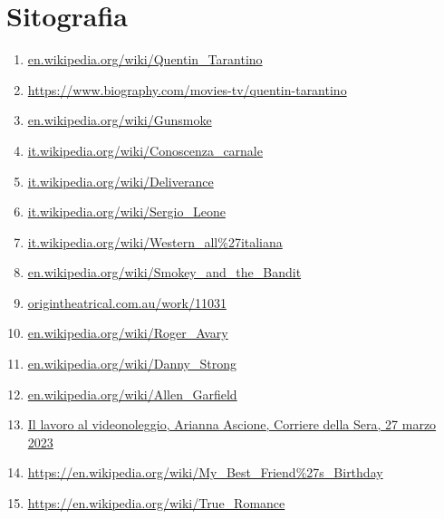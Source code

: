 \documentclass[12pt]{article} %
\begin{document}
\section {Sitografia}
\begin{flushleft}
    \small
    \begin{enumerate}
        \item \href{https://en.wikipedia.org/wiki/Quentin_Tarantino}{en.wikipedia.org/wiki/Quentin\_Tarantino}
        \item \href{https://https://www.biography.com/movies-tv/quentin-tarantino}{https://www.biography.com/movies-tv/quentin-tarantino}
        \item \href{https://en.wikipedia.org/wiki/Gunsmoke}{en.wikipedia.org/wiki/Gunsmoke}
        \item \href{https://it.wikipedia.org/wiki/Conoscenza_carnale}{it.wikipedia.org/wiki/Conoscenza\_carnale}
        \item \href{https://it.wikipedia.org/wiki/Deliverance}{it.wikipedia.org/wiki/Deliverance}
        \item \href{https://it.wikipedia.org/wiki/Sergio_Leone}{it.wikipedia.org/wiki/Sergio\_Leone}
        \item \href{https://it.wikipedia.org/wiki/Western_all%27italiana}{it.wikipedia.org/wiki/Western\_all\%27italiana}
        \item \href{https://en.wikipedia.org/wiki/Smokey_and_the_Bandit}{en.wikipedia.org/wiki/Smokey\_and\_the\_Bandit}
        \item \href{https://origintheatrical.com.au/work/11031}{origintheatrical.com.au/work/11031}
        \item \href{https://en.wikipedia.org/wiki/Roger_Avary}{en.wikipedia.org/wiki/Roger\_Avary}
        \item \href{https://en.wikipedia.org/wiki/Danny_Strong}{en.wikipedia.org/wiki/Danny\_Strong}
        \item \href{https://en.wikipedia.org/wiki/Allen_Garfield}{en.wikipedia.org/wiki/Allen\_Garfield}
        \item \href{https://www.corriere.it/spettacoli/cinema-serie-tv/cards/quentin-tarantino-compie-60-anni-origini-italiane-rapporto-uma-thurman-altri-segreti-di-lui/lavoro-videonoleggio.shtml}{Il lavoro al videonoleggio, Arianna Ascione, Corriere della Sera, 27 marzo 2023}
        \item \href{https://en.wikipedia.org/wiki/My_Best_Friend%27s_Birthday}{https://en.wikipedia.org/wiki/My\_Best\_Friend\%27s\_Birthday}
        \item \href{https://en.wikipedia.org/wiki/True_Romance}{https://en.wikipedia.org/wiki/True\_Romance}

\end{enumerate}
\end{flushleft}
\end{document}
